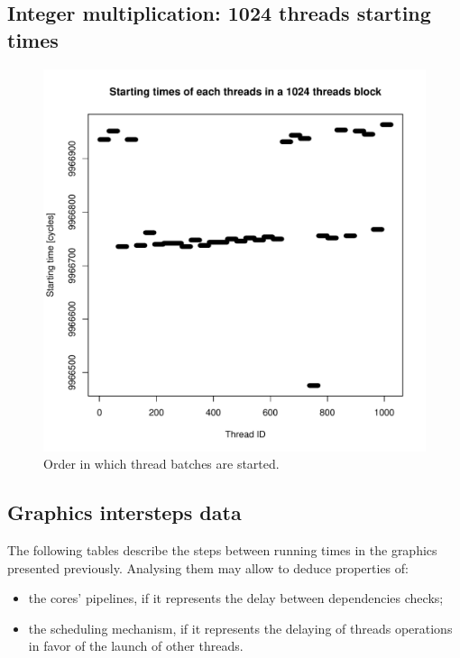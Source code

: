 \documentclass{article}
\def \scalingfactor{.8}
\begin{document}
	\subsection{Integer multiplication: 1024 threads starting times}
    \begin{figure}[h]
    		\centering
		\vspace{-20pt}
	    	\includegraphics[width=\scalingfactor\linewidth]{"graphics/starting_times_ratio31"}
	    	\vspace{-15pt}
	    	\caption{Order in which thread batches are started.}
    \end{figure}

    \subsection{Graphics intersteps data}
    The following tables describe the steps between running times in the graphics presented previously. Analysing them may allow to deduce properties of: 
    \begin{itemize} 
        \item the cores' pipelines, if it represents the delay between dependencies checks;
        \item the scheduling mechanism, if it represents the delaying of threads operations in favor of the launch of other threads.
    \end{itemize}
    \centering
    
    
    \pagebreak
    
\end{document}
